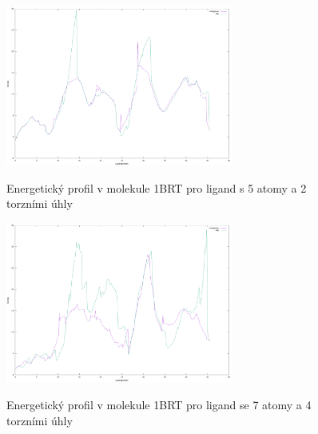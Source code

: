 \begin{figure}[ht]
\centering
\begin{minipage}{.5\textwidth}
  \centering
    \includegraphics[width=75mm]{img/1BRT_energy_0.png}
    \caption{Energetický profil v molekule 1BRT pro ligand s 5 atomy a 2 torzními úhly}
  \centering
  \label{fig:1BRT_energy_0}
\end{minipage}%
\begin{minipage}{.5\textwidth}
     \centering
    \includegraphics[width=75mm]{img/1BRT_energy_1.png}
    \caption{Energetický profil v molekule 1BRT pro ligand se 7 atomy a 4 torzními úhly}
  \centering
  \label{fig:1BRT_energy_1}
\end{minipage}
\end{figure}


